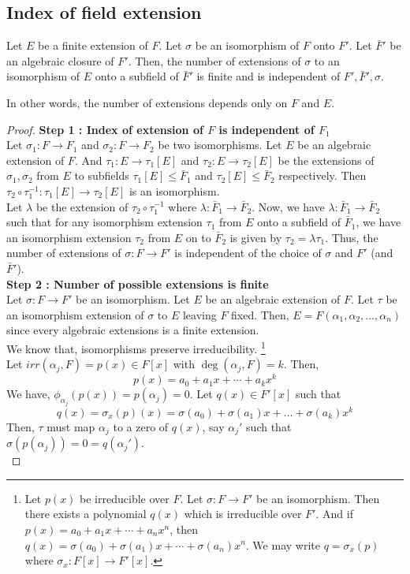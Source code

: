 \subsection{Index of field extension}
\begin{theorem}
	Let $E$ be a finite extension of $F$.
	Let $\sigma$ be an isomorphism of $F$ onto $F'$.
	Let $\bar{F}'$ be an algebraic closure of $F'$.
	Then, the number of extensions of $\sigma$ to an isomorphism of $E$ onto a subfield of $\bar{F}'$ is finite and is independent of $F',\bar{F}',\sigma$.
\end{theorem}
\begin{important}
	In other words, the number of extensions depends only on $F$ and $E$.
\end{important}
\begin{proof}
	\textbf{Step 1 : Index of extension of $F$ is independent of $F_1$}\\
	Let $\sigma_1 : F \to F_1$ and $\sigma_2 : F \to F_2$ be two isomorphisms.
	Let $E$ be an algebraic extension of $F$.
	And $\tau_1 : E \to \tau_1[E]$ and $\tau_2 : E \to \tau_2[E]$ be the extensions of $\sigma_1,\sigma_2$ from $E$ to subfields $\tau_1[E] \le \bar{F}_1$ and $\tau_2[E] \le \bar{F}_2$ respectively.
	Then $\tau_2 \circ \tau_1^{-1} : \tau_1[E] \to \tau_2[E]$ is an isomorphism.\\

	Let $\lambda$ be the extension of $\tau_2 \circ \tau_1^{-1}$ where $\lambda : \bar{F}_1 \to \bar{F}_2$.
	Now, we have $\lambda : \bar{F}_1 \to \bar{F}_2$ such that for any isomorphism extension $\tau_1$ from $E$ onto a subfield of $\bar{F}_1$, we have an isomorphism extension $\tau_2$ from $E$ on to $\bar{F}_2$ is given by $\tau_2 = \lambda\tau_1$.
	Thus, the number of extensions of $\sigma : F \to F'$ is independent of the choice of $\sigma$ and $F'$ (and $\bar{F}'$).\\

	\textbf{Step 2 : Number of possible extensions is finite}\\
	Let $\sigma : F \to F'$ be an isomorphism.
	Let $E$ be an algebraic extension of $F$.
	Let $\tau$ be an isomorphism extension of $\sigma$ to $E$ leaving $F$ fixed.
	Then, $E = F(\alpha_1,\alpha_2,\dots,\alpha_n)$ since every algebraic extensions is a finite extension.\\

	We know that, isomorphisms preserve irreducibility.
	\dag\footnote{Let $p(x)$ be irreducible over $F$.
	Let $\sigma : F \to F'$ be an isomorphism.
	Then there exists a polynomial $q(x)$ which is irreducible over $F'$.
	And if $p(x) = a_0 + a_1 x + \dotsb +a_nx^n$, then $q(x) = \sigma(a_0) + \sigma(a_1)x + \dotsb + \sigma(a_n)x^n$.
	We may write $q = \sigma_x(p)$ where $\sigma_x : F[x] \to F'[x]$.}\\
	Let $irr(\alpha_j,F) = p(x) \in F[x]$ with $\deg(\alpha_j,F) = k$.
	Then, 
	\[ p(x) = a_0 + a_1 x + \dotsb + a_k x^k \]
	We have, $\phi_{\alpha_j}(p(x)) = p(\alpha_j) = 0$.
	Let $q(x) \in F'[x]$ such that 
	\[ q(x) = \sigma_x(p)(x) = \sigma(a_0) + \sigma(a_1) x + \dots + \sigma(a_k) x^k \]
	Then, $\tau$ must map $\alpha_j$ to a zero of $q(x)$, say $\alpha_j'$ such that $\sigma(p(\alpha_j)) = 0 = q(\alpha_j')$.\\


\end{proof}
